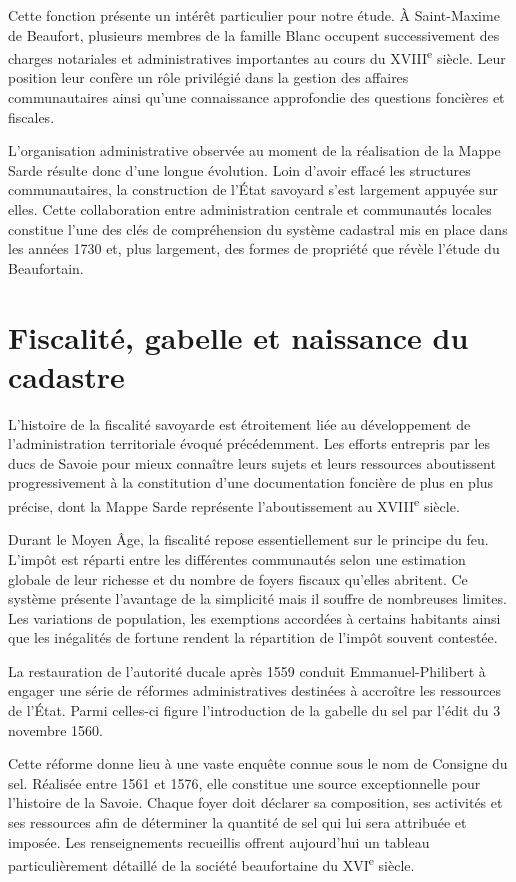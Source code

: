 \documentclass[12pt,a4paper]{report}
\begin{document}
Cette fonction présente un intérêt particulier pour notre étude. À Saint-Maxime de Beaufort, plusieurs membres de la famille Blanc occupent successivement des charges notariales et administratives importantes au cours du XVIII\textsuperscript{e} siècle. Leur position leur confère un rôle privilégié dans la gestion des affaires communautaires ainsi qu'une connaissance approfondie des questions foncières et fiscales.

L'organisation administrative observée au moment de la réalisation de la Mappe Sarde résulte donc d'une longue évolution. Loin d'avoir effacé les structures communautaires, la construction de l'État savoyard s'est largement appuyée sur elles. Cette collaboration entre administration centrale et communautés locales constitue l'une des clés de compréhension du système cadastral mis en place dans les années 1730 et, plus largement, des formes de propriété que révèle l'étude du Beaufortain.

\section{Fiscalité, gabelle et naissance du cadastre}

L'histoire de la fiscalité savoyarde est étroitement liée au développement de l'administration territoriale évoqué précédemment. Les efforts entrepris par les ducs de Savoie pour mieux connaître leurs sujets et leurs ressources aboutissent progressivement à la constitution d'une documentation foncière de plus en plus précise, dont la Mappe Sarde représente l'aboutissement au XVIII\textsuperscript{e} siècle.

Durant le Moyen Âge, la fiscalité repose essentiellement sur le principe du feu. L'impôt est réparti entre les différentes communautés selon une estimation globale de leur richesse et du nombre de foyers fiscaux qu'elles abritent. Ce système présente l'avantage de la simplicité mais il souffre de nombreuses limites. Les variations de population, les exemptions accordées à certains habitants ainsi que les inégalités de fortune rendent la répartition de l'impôt souvent contestée.

La restauration de l'autorité ducale après 1559 conduit Emmanuel-Philibert à engager une série de réformes administratives destinées à accroître les ressources de l'État. Parmi celles-ci figure l'introduction de la gabelle du sel par l'édit du 3 novembre 1560.

Cette réforme donne lieu à une vaste enquête connue sous le nom de Consigne du sel. Réalisée entre 1561 et 1576, elle constitue une source exceptionnelle pour l'histoire de la Savoie. Chaque foyer doit déclarer sa composition, ses activités et ses ressources afin de déterminer la quantité de sel qui lui sera attribuée et imposée. Les renseignements recueillis offrent aujourd'hui un tableau particulièrement détaillé de la société beaufortaine du XVI\textsuperscript{e} siècle.
\end{document}

